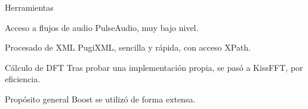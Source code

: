 \begin{frame}{Herramientas}
  \begin{block}{Acceso a flujos de audio}
    PulseAudio, muy bajo nivel.
  \end{block}

  \begin{block}{Procesado de XML}
    PugiXML, sencilla y rápida, con acceso XPath.
  \end{block}

  \begin{block}{Cálculo de DFT}
    Tras probar una implementación propia, se pasó a KissFFT, por eficiencia.
  \end{block}

  \begin{block}{Propósito general}
    Boost se utilizó de forma extensa.
  \end{block}
\end{frame}

